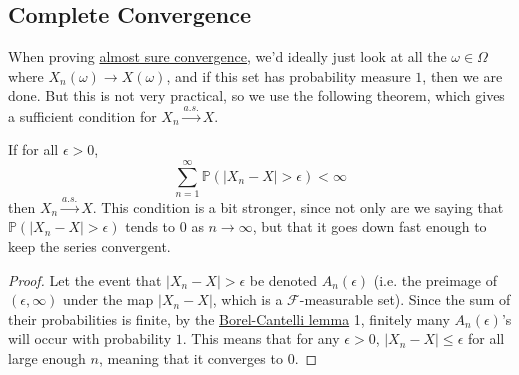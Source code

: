 \subsection{Complete Convergence}

  When proving \hyperref[mt-def:almost-sure-convergence]{almost sure convergence}, we'd ideally just look at all the $\omega \in \Omega$ where $X_n (\omega) \rightarrow X(\omega)$, and if this set has probability measure $1$, then we are done. But this is not very practical, so we use the following theorem, which gives a sufficient condition for $X_n \xrightarrow{a.s.} X$. 

  \begin{theorem}
    \label{thm:complete-convergence-implies-almost-sure}
    If for all $\epsilon > 0$, 
    \begin{equation}
      \sum_{n=1}^\infty \mathbb{P}(|X_n - X| > \epsilon ) < \infty
    \end{equation}
    then $X_n \xrightarrow{a.s.} X$. This condition is a bit stronger, since not only are we saying that $\mathbb{P}(|X_n - X| > \epsilon)$ tends to $0$ as $n \rightarrow \infty$, but that it goes down fast enough to keep the series convergent. 
  \end{theorem}
  \begin{proof}
    Let the event that $|X_n - X| > \epsilon$ be denoted $A_n (\epsilon)$ (i.e. the preimage of $(\epsilon, \infty)$ under the map $|X_n - X|$, which is a $\mathcal{F}$-measurable set). Since the sum of their probabilities is finite, by the \hyperref[mt-thm:borel-cantelli-lemma]{Borel-Cantelli lemma} 1, finitely many $A_n(\epsilon)$'s will occur with probability $1$. This means that for any $\epsilon > 0$, $|X_n - X| \leq \epsilon$ for all large enough $n$, meaning that it converges to $0$. 
  \end{proof}

